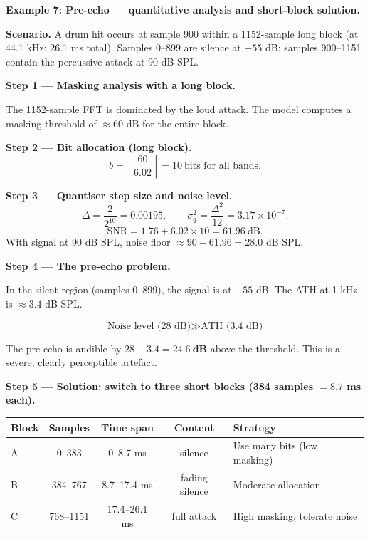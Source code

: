 \begin{examplebox}
\textbf{Example 7: Pre-echo --- quantitative analysis and short-block solution.}

\medskip
\noindent\textbf{Scenario.} A drum hit occurs at sample 900 within a 1152-sample long block (at 44.1 kHz: 26.1 ms total). Samples 0--899 are silence at $-55$ dB; samples 900--1151 contain the percussive attack at 90 dB SPL.

\medskip
\noindent\textbf{Step 1 --- Masking analysis with a long block.}

The 1152-sample FFT is dominated by the loud attack. The model computes a masking threshold of $\approx$60 dB for the entire block.

\medskip
\noindent\textbf{Step 2 --- Bit allocation (long block).}
\[
b = \left\lceil \frac{60}{6.02} \right\rceil = 10\ \text{bits for all bands}.
\]

\medskip
\noindent\textbf{Step 3 --- Quantiser step size and noise level.}
\[
\Delta = \frac{2}{2^{10}} = 0.00195, \qquad
\sigma_q^2 = \frac{\Delta^2}{12} = 3.17\times10^{-7}.
\]
\[
\mathrm{SNR} = 1.76 + 6.02\times10 = 61.96\ \text{dB}.
\]
With signal at 90 dB SPL, noise floor $\approx 90 - 61.96 = 28.0$ dB SPL.

\medskip
\noindent\textbf{Step 4 --- The pre-echo problem.}

In the silent region (samples 0--899), the signal is at $-55$ dB. The ATH at 1 kHz is $\approx 3.4$ dB SPL.

\[
\text{Noise level (28 dB)} \gg \text{ATH (3.4 dB)}
\]

The pre-echo is audible by $28 - 3.4 = \mathbf{24.6\ \text{dB}}$ above the threshold. This is a severe, clearly perceptible artefact.

\medskip
\noindent\textbf{Step 5 --- Solution: switch to three short blocks (384 samples $= 8.7$ ms each).}

\begin{center}
\begin{tabular}{lcccl}
\toprule
Block & Samples & Time span & Content & Strategy \\
\midrule
A & 0--383   & 0--8.7 ms   & silence            & Use many bits (low masking) \\
B & 384--767 & 8.7--17.4 ms& fading silence     & Moderate allocation \\
C & 768--1151& 17.4--26.1 ms& full attack       & High masking; tolerate noise \\
\bottomrule
\end{tabular}
\end{center}


\end{examplebox}
